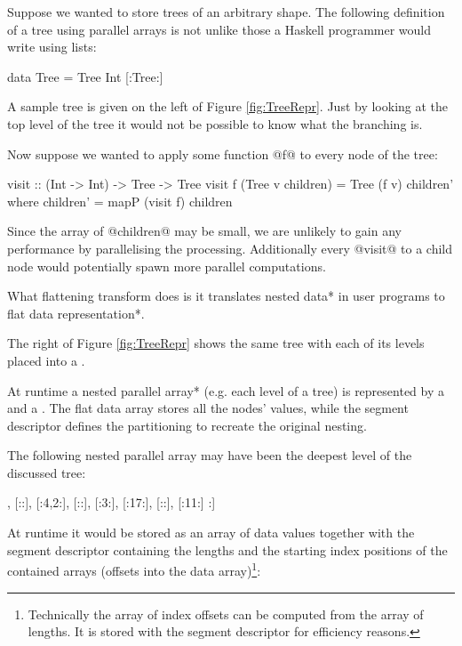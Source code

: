 \documentclass[preamble.tex]{subfiles}
\begin{document}
Suppose we wanted to store trees of an arbitrary shape. The following definition of a tree using parallel arrays is not unlike those a Haskell programmer would write using lists:

\begin{hscode}
data Tree = Tree Int [:Tree:]
\end{hscode}

A sample tree is given on the left of Figure \ref{fig:TreeRepr}. Just by looking at the top level of the tree it would not be possible to know what the branching is.

Now suppose we wanted to apply some function @f@ to every node of the tree:
\begin{hscode}
visit :: (Int -> Int) -> Tree -> Tree
visit f (Tree v children) = Tree (f v) children'
  where children' = mapP (visit f) children
\end{hscode}

Since the array of @children@ may be small, we are unlikely to gain any performance by parallelising the processing. Additionally every @visit@ to a child node would potentially spawn more parallel computations. 

\begin{bluebox}
What flattening transform does is it translates \*nested data* in user programs to \*flat data representation*.
\end{bluebox}

The right of Figure \ref{fig:TreeRepr} shows the same tree with each of its levels placed into a .

At runtime a \*nested parallel array* (e.g. each level of a tree) is represented by a  and a \isegd{}. The flat data array stores all the nodes' values, while the segment descriptor defines the partitioning to recreate the original nesting.

The following nested parallel array may have been the deepest level of the discussed tree:

\begin{hscode}
[: [:5:], [::], [:4,2:], [::], [:3:], [:17:], [::], [:11:] :]
\end{hscode}

At runtime it would be stored as an array of data values together with the segment descriptor containing the lengths and the starting index positions of the contained arrays (offsets into the data array)\footnote{Technically the array of index offsets can be computed from the array of lengths. It is stored with the segment descriptor for efficiency reasons.}:
\end{document}
